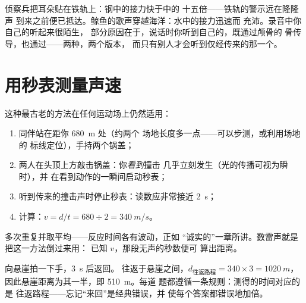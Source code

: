 \begin{example}\label{ex:g7:sound-production:scenes}
侦察兵把耳朵贴在铁轨上：钢中的接力快于中的
十五倍——铁轨的警示远在隆隆声
到来之前便已抵达。鲸鱼的歌声穿越海洋：水中的接力迅速而
充沛。录音中你自己的听起来很陌生，
部分原因在于，说话时你听到自己的，既通过颅骨的
骨传导，也通过——两种，两个版本，
而只有别人才会听到仅经传来的那一个。
\end{example}

\section{用秒表测量声速}

\begin{method}[测量声速]\label{met:g7:sound-production:measure}
这种最古老的方法在任何运动场上仍然适用：
\begin{enumerate}
  \item 同伴站在距你 \qty{680}{m} 处（约两个
        场地长度多一点——可以步测，或利用场地的
        标线定位），手持两个锅盖；
  \item 两人在头顶上方敲击锅盖：你\emph{看到}撞击
        几乎立刻发生（光的传播可视为瞬时），并
        在看到动作的一瞬间启动秒表；
  \item 听到传来的撞击声时停止秒表：读数应非常接近
        \qty{2}{s}；
  \item 计算：$v = d/t = 680 \div 2 = \qty{340}{m/s}$。
\end{enumerate}
多次重复并取平均——反应时间各有波动，正如
“诚实的”一章所讲。数雷声就是把这一方法倒过来用：
已知 $v$，那段无声的秒数便可
算出距离。
\end{method}

\begin{example}[回声的计算]\label{ex:g7:sound-production:echo}
向悬崖拍一下手，\qty{3}{s} 后返回。
往返于悬崖之间，$d_{\text{往返路程}} = 340 \times 3 =
\qty{1020}{m}$，因此悬崖距离为其一半，即 \qty{510}{m}。每道
题都遵循一条规则：测得的时间对应的是
往返路程——忘记“来回”是经典错误，并
使每个答案都错误地加倍。
\end{example}

